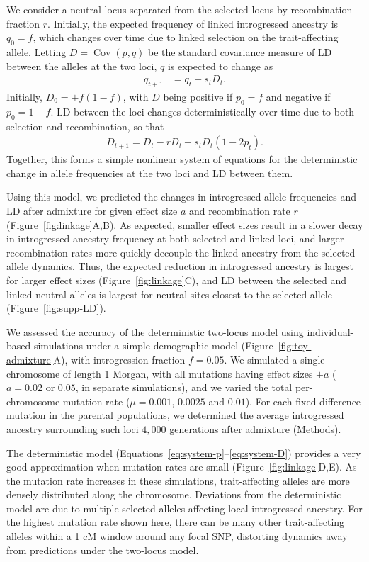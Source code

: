 \documentclass{article}
\DeclareMathOperator{\Cov}{Cov}
\begin{document}
We consider a neutral locus separated from the selected locus by recombination
fraction $r$. Initially, the expected frequency of linked introgressed ancestry
is \(q_0=f\), which changes over time due to linked selection on the
trait-affecting allele. Letting \(D=\Cov(p,q)\) be the standard covariance
measure of LD between the alleles at the two loci, $q$ is expected to change as
\begin{align}\label{eq:system-q}
    q_{t+1} & = q_t + s_t D_t.
\end{align}
Initially, \(D_0=\pm f(1-f)\), with \(D\) being positive if \(p_0=f\) and
negative if \(p_0=1-f\). LD between the loci changes deterministically over
time due to both selection and recombination, so that
\begin{align}\label{eq:system-D}
    D_{t+1} = D_t - r D_t + s_t D_t (1-2p_t).
\end{align}
Together, this forms a simple nonlinear system of equations for the
deterministic change in allele frequencies at the two loci and LD between them.

Using this model, we predicted the changes in introgressed allele frequencies
and LD after admixture for given effect size $a$ and recombination rate $r$
(Figure~\ref{fig:linkage}A,B). As expected, smaller effect sizes result in a
slower decay in introgressed ancestry frequency at both selected and linked
loci, and larger recombination rates more quickly decouple the linked ancestry
from the selected allele dynamics. Thus, the expected reduction in introgressed
ancestry is largest for larger effect sizes (Figure~\ref{fig:linkage}C), and LD
between the selected and linked neutral alleles is largest for neutral sites
closest to the selected allele (Figure~\ref{fig:supp-LD}).

We assessed the accuracy of the deterministic two-locus model using
individual-based simulations \citep{thornton2019polygenic} under a simple
demographic model (Figure~\ref{fig:toy-admixture}A), with introgression
fraction \(f=0.05\). We simulated a single chromosome of length 1 Morgan, with
all mutations having effect sizes \(\pm a\) (\(a=0.02\) or \(0.05\), in
separate simulations), and we varied the total per-chromosome mutation rate
(\(\mu=0.001\), \(0.0025\) and \(0.01\)). For each fixed-difference mutation in
the parental populations, we determined the average introgressed ancestry
surrounding such loci $4{,}000$ generations after admixture (Methods).

The deterministic model (Equations~\ref{eq:system-p}--\ref{eq:system-D})
provides a very good approximation when mutation rates are small
(Figure~\ref{fig:linkage}D,E). As the mutation rate increases in these
simulations, trait-affecting alleles are more densely distributed along the
chromosome. Deviations from the deterministic model are due to multiple
selected alleles affecting local introgressed ancestry. For the highest
mutation rate shown here, there can be many other trait-affecting alleles
within a 1 cM window around any focal SNP, distorting dynamics away from
predictions under the two-locus model.
\end{document}
